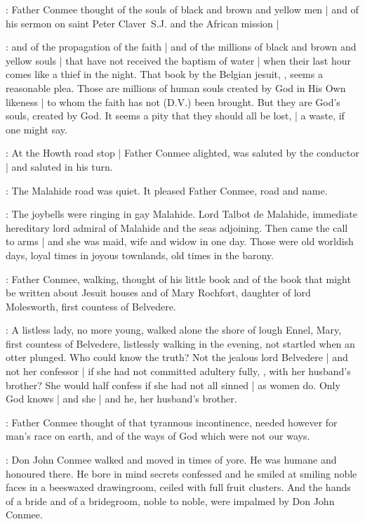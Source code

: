 :
Father Conmee thought of the souls of black and brown and yellow men |
and of his sermon on saint Peter Claver~S.J. and the African mission |

\conmeeint:
and of the propagation of the faith |
and of the millions of black and brown and yellow souls |
that have not received the baptism of water |
when their last hour comes like a thief in the night.
That book by the Belgian jesuit,
,
seems a reasonable plea.
Those are millions of human souls created by God in His Own likeness |
to whom the faith has not (D.V.) been brought.%
But they are God's souls, created by God.
It seems a pity that they should all be lost, |
a waste, if one might say.

:
At the Howth road stop |
Father Conmee alighted,
was saluted by the conductor |
and saluted in his turn.

:
The Malahide road was quiet.
It pleased Father Conmee, road and name.

\conmeeint:
The joybells were ringing in gay Malahide.
Lord Talbot de Malahide,
immediate hereditary lord admiral of Malahide and the seas adjoining.
Then came the call to arms |
and she was maid, wife and widow in one day.
Those were old worldish days,
loyal times in joyous townlands,
old times in the barony.%

:
Father Conmee, walking, thought of his little book
and of the book that might be written about Jesuit houses
and of Mary Rochfort,
daughter of lord Molesworth,
first countess of Belvedere.

\conmeeint:
A listless lady, no more young,
walked alone the shore of lough Ennel,
Mary, first countess of Belvedere,
listlessly walking in the evening,
not startled when an otter plunged.
Who could know the truth?
Not the jealous lord Belvedere |
and not her confessor |
if she had not committed adultery fully,
,
with her husband's brother?
She would half confess if she had not all sinned |
as women do.%
Only God knows |
and she |
and he, her husband's brother.

:
Father Conmee thought of that tyrannous incontinence,
needed however for man's race on earth,
and of the ways of God which were not our ways.

:
Don John Conmee walked and moved in times of yore.
He was humane and honoured there.
He bore in mind secrets confessed
and he smiled at smiling noble faces in a beeswaxed drawingroom,
ceiled with full fruit clusters.
And the hands of a bride and of a bridegroom,
noble to noble,
were impalmed by Don John Conmee.

